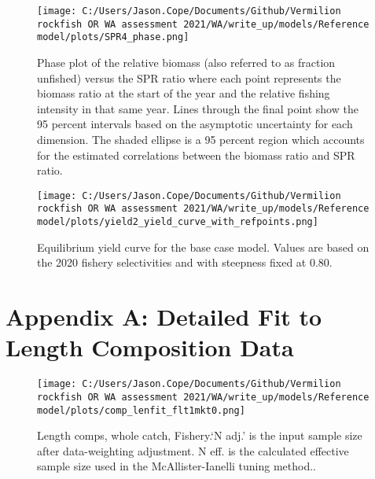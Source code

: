 \documentclass[11pt,
  english,
  a4paper,
]{article}
\begin{document}
\begin{figure}
\centering
\texttt{[image: C:/Users/Jason.Cope/Documents/Github/Vermilion rockfish OR WA assessment 2021/WA/write\_up/models/Reference model/plots/SPR4\_phase.png]}
\caption{Phase plot of the relative biomass (also referred to as fraction unfished) versus the SPR ratio where each point represents the biomass ratio at the start of the year and the relative fishing intensity in that same year. Lines through the final point show the 95 percent intervals based on the asymptotic uncertainty for each dimension. The shaded ellipse is a 95 percent region which accounts for the estimated correlations between the biomass ratio and SPR ratio.\label{fig:phase}}
\end{figure}

\tagmcend\tagstructend


\begin{figure}
\centering
\texttt{[image: C:/Users/Jason.Cope/Documents/Github/Vermilion rockfish OR WA assessment 2021/WA/write\_up/models/Reference model/plots/yield2\_yield\_curve\_with\_refpoints.png]}
\caption{Equilibrium yield curve for the base case model. Values are based on the 2020 fishery selectivities and with steepness fixed at 0.80.\label{fig:yield}}
\end{figure}

\tagmcend\tagstructend

\clearpage


\hypertarget{app-a}{%
\section{Appendix A: Detailed Fit to Length Composition Data}\label{app-a}}

\leavevmode\tagmcend\tagstructend


\begin{figure}
\centering
\texttt{[image: C:/Users/Jason.Cope/Documents/Github/Vermilion rockfish OR WA assessment 2021/WA/write\_up/models/Reference model/plots/comp\_lenfit\_flt1mkt0.png]}
\caption{Length comps, whole catch, Fishery.`N adj.' is the input sample size after data-weighting adjustment. N eff. is the calculated effective sample size used in the McAllister-Ianelli tuning method..\label{fig:comp_lenfit_flt1mkt0}}
\end{figure}
\end{document}
